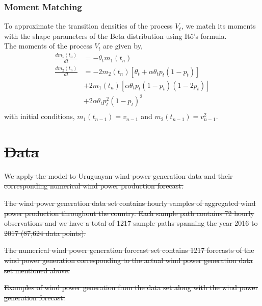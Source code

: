 \documentclass[ima, 20pt, portrait, plainboxedsections]{sciposter}
\newcommand{\E}{\mathbb{E}}
\providecommand{\DIFdel}[1]{{\protect\color{red}\sout{#1}}}                      %
\providecommand{\DIFdelbegin}{} %
\providecommand{\DIFdelFL}[1]{\DIFdel{#1}} %
\begin{document}
\begin{multicols}{3}
\subsubsection*{ Moment Matching}
To approximate the transition densities of  the process $V_t$, we match its moments with the shape parameters of the Beta distribution using It\^{o}'s formula. \\

The moments of the process $V_t$ are given by,
\begin{equation}
\begin{split}
 \frac{dm_1(t_n)}{dt} &=    - \theta_t m_1(t_n)  \\
\frac{d m_{2}(t_n)}{dt}&= -2m_{2}(t_n) [\theta_t + \alpha \theta_t p_t(1-p_t) ] \\
&+ 2m_{1}(t_n)[\alpha \theta_t p_t (1-p_t) (1-2p_t)] \\
&+ 2\alpha \theta_t p_t^2(1-p_t)^2  \\
\end{split}
\end{equation}
with initial conditions, $m_1(t_{n-1})= v_{n-1}$ and $m_2(t_{n-1})= v_{n-1}^2$.



\DIFdelbegin \section*{\DIFdel{Data}}

\DIFdel{We apply the model to Uruguayan wind power generation data and their corresponding numerical wind power production forecast. }%

\DIFdel{The wind power generation data set contains hourly samples of aggregated wind power production throughout the country. Each sample path contains 72 hourly observations and we have a total of 1217 sample paths spanning the year 2016 to 2017 (87,624 data points). }%

\DIFdel{The numerical wind power generation forecast set contains  1217 forecasts of the wind power generation  corresponding to the actual  wind power generation data set mentioned above.
}%

{%
\DIFdelFL{Examples of wind power generation from the data set along with the wind power generation forecast.}}


\end{multicols}
\end{document}
